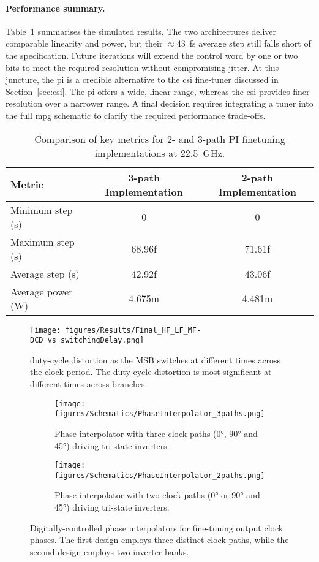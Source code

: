 \paragraph{Performance summary.} Table~\ref{tab:phase_interpolator_metrics} summarises the simulated results. The two architectures deliver comparable linearity and power, but their \(\approx\)43~fs average step still falls short of the specification. Future iterations will extend the control word by one or two bits to meet the required resolution without compromising jitter.
At this juncture, the \gls{pi} is a credible alternative to the \gls{csi} fine‑tuner discussed in Section~\ref{sec:csi}. The \gls{pi} offers a wide, linear range, whereas the \gls{csi} provides finer resolution over a narrower range. A final decision requires integrating a tuner into the full \gls{mpg} schematic to clarify the required performance trade-offs.
\begin{table}[h]
\centering
\caption{Comparison of key metrics for 2- and 3-path PI finetuning implementations at 22.5~GHz.}
\begin{tabular}{|l|c|c|}
\hline
\textbf{Metric} & \textbf{3-path Implementation} & \textbf{2-path Implementation} \\
\hline
Minimum step (s) & 0 & 0 \\
Maximum step (s) & 68.96f & 71.61f \\
Average step (s) & 42.92f & 43.06f \\
Average power (W) & 4.675m & 4.481m \\
\hline
\end{tabular}
\label{tab:phase_interpolator_metrics}
\end{table}
\begin{figure}[h]
  \centering
  \texttt{[image: figures/Results/Final\_HF\_LF\_MF-DCD\_vs\_switchingDelay.png]}
  \caption{duty‑cycle distortion as the MSB switches at different times across the clock period. The duty-cycle distortion is most significant at different times across branches.}
  \label{fig:dcd_MSB}
\end{figure}
\begin{figure}[h]
  \centering
  \hfill
  \begin{subfigure}[t]{0.3\linewidth}
    \centering
    \texttt{[image: figures/Schematics/PhaseInterpolator\_3paths.png]}
    \caption{Phase interpolator with three clock paths (\ang{0}, \ang{90} and \ang{45}) driving tri-state inverters.}
    \label{fig:phase_interpolator_3paths}
  \end{subfigure}%
  \hfill
  \begin{subfigure}[t]{0.3\linewidth}
    \centering
    \texttt{[image: figures/Schematics/PhaseInterpolator\_2paths.png]}
    \caption{Phase interpolator with two clock paths (\ang{0} or \ang{90} and \ang{45}) driving tri-state inverters.}
    \label{fig:phase_interpolator_2paths}
  \end{subfigure}
  \hfill\null
  \caption{Digitally-controlled phase interpolators for fine-tuning output clock phases. The first design employs three distinct clock paths, while the second design employs two inverter banks.}
  \label{fig:phase_interpolators}
\end{figure}
